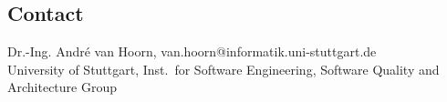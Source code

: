 \documentclass[a4paper,12pt]{article}
\begin{document}
\begin{scriptsize}


\end{scriptsize}

\subsection*{Contact}
Dr.-Ing. André van Hoorn, van.hoorn@informatik.uni-stuttgart.de \\
University of Stuttgart, Inst.\ for Software Engineering, Software Quality and Architecture Group \\
\end{document}
